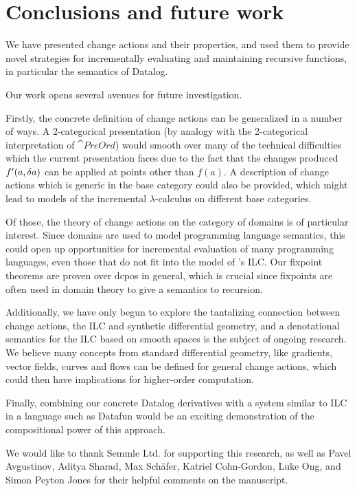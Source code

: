\section{Conclusions and future work}

We have presented change actions and their properties, and used them to provide novel
strategies for incrementally evaluating and maintaining recursive functions, in
particular the semantics of Datalog.

Our work opens several avenues for future investigation.

Firstly, the concrete definition of change actions can be generalized in a number of
ways. A 2-categorical presentation (by analogy with the 2-categorical interpretation
of $\cat{PreOrd}$) would smooth over many of the technical difficulties which
the current presentation faces due to the fact that the changes produced
$f'(a, \delta a)$ can be applied at points other than $f(a)$.
A description of change actions which is generic in
the base category could also be provided, which might lead to models of
the incremental $\lambda$-calculus on different base categories. 

Of those, the theory of change actions on the category of domains is of particular interest. Since
domains are used to model programming language semantics, this could
open up opportunities for incremental evaluation of many programming languages,
even those that do not fit into the model of \citeauthor{cai2014changes}'s ILC.
Our fixpoint theorems are proven over dcpos in general, which is crucial since
fixpoints are often used in domain theory to give a semantics to recursion.

Additionally, we have only begun to explore the tantalizing connection between
change actions, the ILC and synthetic
differential geometry, and a denotational semantics for the
ILC based on smooth spaces is the subject of ongoing research. We believe many concepts
from standard differential geometry, like gradients, vector fields, curves and flows can
be defined for general change actions, which could then have implications for higher-order
computation.

Finally, combining our concrete Datalog derivatives with a system similar to ILC
in a language such as Datafun would be an exciting demonstration of the compositional
power of this approach.

\begin{acks}

We would like to thank Semmle Ltd. for supporting this research, as well as Pavel
Avgustinov, Aditya Sharad, Max Sch\"afer, Katriel Cohn-Gordon, Luke Ong, and Simon Peyton Jones for their
helpful comments on the manuscript.

\end{acks}

